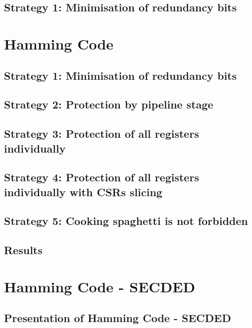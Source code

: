 \subsection{Strategy 1: Minimisation of redundancy bits}

\section{Hamming Code}
\label{section:chap6_hammingcode}

\subsection{Strategy 1: Minimisation of redundancy bits}

\subsection{Strategy 2: Protection by pipeline stage}

\subsection{Strategy 3: Protection of all registers individually}

\subsection{Strategy 4: Protection of all registers individually with CSRs slicing}

\subsection{Strategy 5: Cooking spaghetti is not forbidden}

\subsection{Results}

\section{Hamming Code - SECDED}
\label{section:chap6_secded}

\subsection{Presentation of Hamming Code - SECDED}


